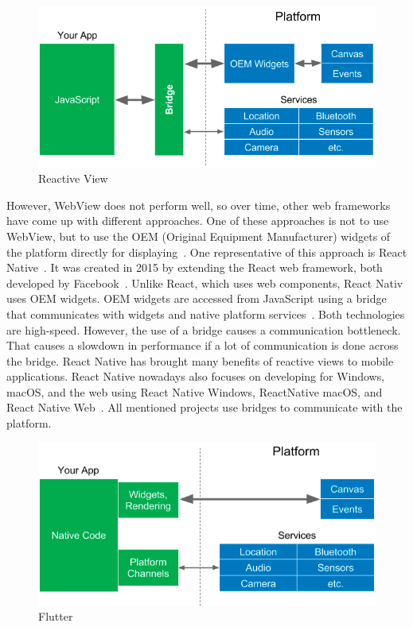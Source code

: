 \begin{figure}
    \centering
    \includegraphics[width=1\linewidth]{assets/design/reactive.png}
    \caption{Reactive View~\cite{leler_2017_whats}}
    \label{fig:design:reactiveview}
\end{figure}

However, WebView does not perform well, so over time, other web frameworks have come up with different approaches.
One of these approaches is not to use WebView, but to use the OEM (Original Equipment Manufacturer) widgets of the platform directly for displaying~\cite{leler_2017_whats}.
One representative of this approach is React Native~\cite{a2022_react}.
It was created in 2015 by extending the React web framework, both developed by Facebook~\cite{a2022_react}.
Unlike React, which uses web components, React Nativ uses OEM widgets.
OEM widgets are accessed from JavaScript using a bridge that communicates with widgets and native platform services~\cite{leler_2017_whats}.
Both technologies are high-speed.
However, the use of a bridge causes a communication bottleneck.
That causes a slowdown in performance if a lot of communication is done across the bridge.
React Native has brought many benefits of reactive views to mobile applications.
React Native nowadays also focuses on developing for Windows, macOS, and the web using React Native Windows, ReactNative macOS, and React Native Web~\cite{a2022_react}.
All mentioned projects use bridges to communicate with the platform.

\begin{figure}
    \centering
    \includegraphics[width=1\linewidth]{assets/design/flutter.png}
    \caption{Flutter~\cite{leler_2017_whats}}
    \label{fig:design:flutterview}
\end{figure}

